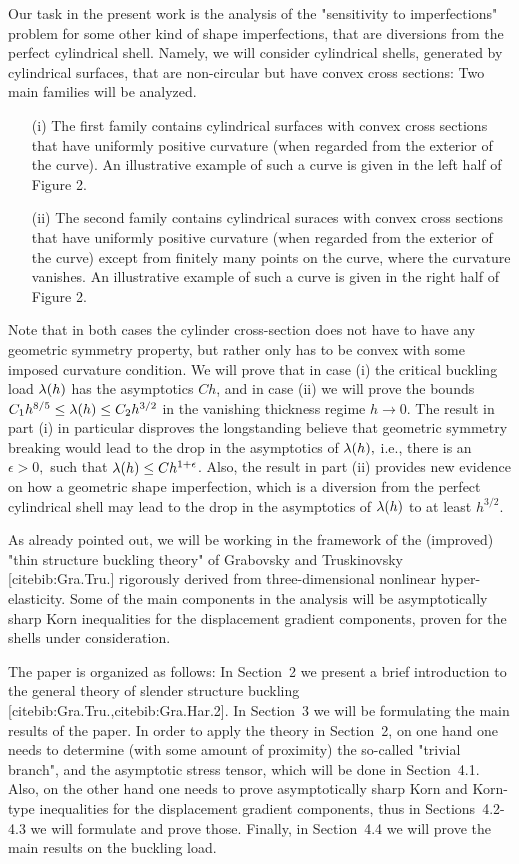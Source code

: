 Our task in the present work is the analysis of the "sensitivity to imperfections" problem for some other kind of shape imperfections, that are diversions from the perfect cylindrical shell. Namely, we will consider cylindrical shells, generated by cylindrical surfaces, that are non-circular but have convex cross sections: Two main families will be analyzed. 
\begin{itemize}
\item[(i)] The first family contains cylindrical surfaces with convex cross sections that have uniformly positive curvature (when regarded from the exterior of the curve). An illustrative example of such a curve is given in the left half of Figure 2. 
\item[(ii)] The second family contains cylindrical suraces with convex cross sections that have uniformly positive curvature (when regarded from the exterior of the curve) except from finitely many points on the curve, where the curvature vanishes. An illustrative example of such a curve is given in the right half of Figure 2. 
\end{itemize}







Note that in both cases the cylinder cross-section does not have to have any geometric symmetry property, but rather only has to be convex with some imposed curvature condition. We will prove that in case (i) the critical buckling load $\lambda(h)$ has the asymptotics $Ch$, and in case (ii) we will prove the bounds
 $C_1h^{8/5}\leq \lambda(h)\leq C_2h^{3/2}$ in the vanishing thickness regime $h\to 0.$ The result in part (i) in particular disproves the longstanding believe that  geometric symmetry breaking would lead to the drop in the asymptotics of $\lambda(h),$ i.e., there is an $\epsilon>0,$ such that $\lambda(h)\leq Ch^{1+\epsilon}$. Also, the result in part (ii) provides new evidence on how a geometric shape imperfection, which is a diversion from the perfect cylindrical shell may lead to the drop in the asymptotics of $\lambda(h)$ to at least $h^{3/2}.$ 

As already pointed out, we will be working in the framework of the (improved) "thin structure buckling theory" of Grabovsky and Truskinovsky [cite{bib:Gra.Tru.}] rigorously derived from three-dimensional nonlinear hyper-elasticity. Some of the main components in the analysis will be asymptotically sharp Korn 
inequalities for the displacement gradient components, proven for the shells under consideration. 

The paper is organized as follows: In Section~2 we present a brief introduction to the general theory of slender structure buckling [cite{bib:Gra.Tru.},cite{bib:Gra.Har.2}]. 
In Section~3 we will be formulating the main results of the paper. In order to apply the theory in Section~2, on one hand one needs to determine 
(with some amount of proximity) the so-called "trivial branch", and the asymptotic stress tensor, which will be done in Section~4.1. Also, on the other hand one needs to prove asymptotically sharp Korn and Korn-type inequalities for the displacement gradient components, thus in Sections~4.2-4.3 we will formulate and prove those. Finally, in Section~4.4 we will prove the main results on the buckling load. 
